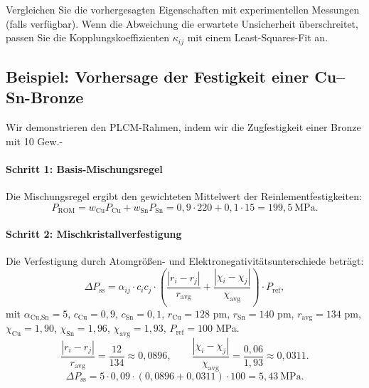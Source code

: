 \documentclass[12pt,a4paper]{article}
\begin{document}
Vergleichen Sie die vorhergesagten Eigenschaften mit experimentellen Messungen (falls verfügbar). Wenn die Abweichung die erwartete Unsicherheit überschreitet, passen Sie die Kopplungskoeffizienten \(\kappa_{ij}\) mit einem Least-Squares-Fit an.


\subsection{Beispiel: Vorhersage der Festigkeit einer Cu–Sn-Bronze}
\label{subsec:example-bronze}

Wir demonstrieren den PLCM-Rahmen, indem wir die Zugfestigkeit einer Bronze mit 10 Gew.-%

\paragraph{Schritt 1: Basis-Mischungsregel}
Die Mischungsregel ergibt den gewichteten Mittelwert der Reinlementfestigkeiten:
\[
P_{\text{ROM}} = w_{\text{Cu}} P_{\text{Cu}} + w_{\text{Sn}} P_{\text{Sn}} = 0,9 \cdot 220 + 0,1 \cdot 15 = 199,5\ \text{MPa}.
\]

\paragraph{Schritt 2: Mischkristallverfestigung}
Die Verfestigung durch Atomgrößen- und Elektronegativitätsunterschiede beträgt:
\[
\Delta P_{\text{ss}} = \alpha_{ij} \cdot c_i c_j \cdot \left( \frac{|r_i - r_j|}{r_{\text{avg}}} + \frac{|\chi_i - \chi_j|}{\chi_{\text{avg}}} \right) \cdot P_{\text{ref}},
\]
mit \(\alpha_{\text{Cu,Sn}} = 5\), \(c_{\text{Cu}}=0,9\), \(c_{\text{Sn}}=0,1\), \(r_{\text{Cu}}=128\) pm, \(r_{\text{Sn}}=140\) pm, \(r_{\text{avg}}=134\) pm, \(\chi_{\text{Cu}}=1,90\), \(\chi_{\text{Sn}}=1,96\), \(\chi_{\text{avg}}=1,93\), \(P_{\text{ref}} = 100\) MPa.
\[
\frac{|r_i - r_j|}{r_{\text{avg}}} = \frac{12}{134} \approx 0,0896, \qquad
\frac{|\chi_i - \chi_j|}{\chi_{\text{avg}}} = \frac{0,06}{1,93} \approx 0,0311.
\]
\[
\Delta P_{\text{ss}} = 5 \cdot 0,09 \cdot (0,0896 + 0,0311) \cdot 100 = 5,43\ \text{MPa}.
\]
\end{document}
